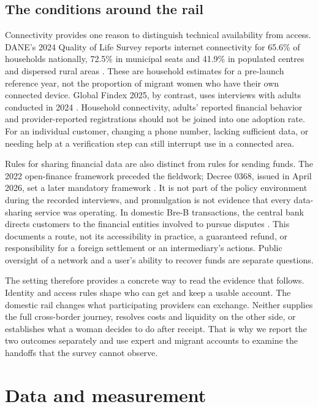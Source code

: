 \documentclass[12pt]{article}
\begin{document}
\subsection{The conditions around the rail}
Connectivity provides one reason to distinguish technical availability from access. DANE's 2024 Quality of Life Survey reports internet connectivity for 65.6\% of households nationally, 72.5\% in municipal seats and 41.9\% in populated centres and dispersed rural areas \citep{daneentic2025}. These are household estimates for a pre-launch reference year, not the proportion of migrant women who have their own connected device. Global Findex 2025, by contrast, uses interviews with adults conducted in 2024 \citep{findex2025}. Household connectivity, adults' reported financial behavior and provider-reported registrations should not be joined into one adoption rate. For an individual customer, changing a phone number, lacking sufficient data, or needing help at a verification step can still interrupt use in a connected area.

Rules for sharing financial data are also distinct from rules for sending funds. The 2022 open-finance framework preceded the fieldwork; Decree 0368, issued in April 2026, set a later mandatory framework \citep{decree1297,decree0368}. It is not part of the policy environment during the recorded interviews, and promulgation is not evidence that every data-sharing service was operating. In domestic Bre-B transactions, the central bank directs customers to the financial entities involved to pursue disputes \citep{banrepfaq}. This documents a route, not its accessibility in practice, a guaranteed refund, or responsibility for a foreign settlement or an intermediary's actions. Public oversight of a network and a user's ability to recover funds are separate questions.

The setting therefore provides a concrete way to read the evidence that follows. Identity and access rules shape who can get and keep a usable account. The domestic rail changes what participating providers can exchange. Neither supplies the full cross-border journey, resolves costs and liquidity on the other side, or establishes what a woman decides to do after receipt. That is why we report the two outcomes separately and use expert and migrant accounts to examine the handoffs that the survey cannot observe.

\section{Data and measurement}
\end{document}
